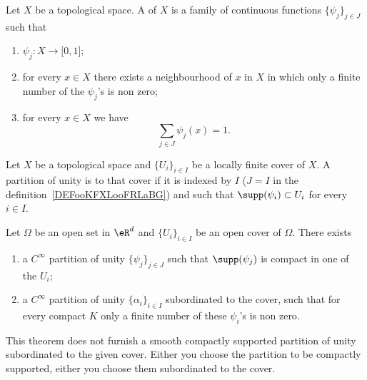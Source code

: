 \begin{definition}       \label{DEFooKFXLooFRLaBG}
	Let \( X\) be a topological space. A  of \( X\) is a family of continuous functions \( \{ \psi_j \}_{j\in J}\) such that
	\begin{enumerate}
		\item
		      \( \psi_j\colon X\to \mathopen[ 0 , 1 \mathclose]\);
		\item
		      for every \( x\in X\) there exists a neighbourhood of \( x\) in \( X\) in which only a finite number of the \( \psi_j\)'s is non zero;
		\item
		      for every \( x\in X\) we have
		      \begin{equation}
			      \sum_{j\in J}\psi_j(x)=1.
		      \end{equation}
	\end{enumerate}
\end{definition}

\begin{definition}
	Let \( X\) be a topological space and \( \{ U_i \}_{i\in I}\) be a locally finite cover of \( X\). A partition of unity is  to that cover if it is indexed by \( I\) (\( J=I\) in the definition~\ref{DEFooKFXLooFRLaBG}) and such that \( \supp(\psi_i)\subset U_i\) for every \( i\in I\).
\end{definition}

\begin{theorem}      \label{THOooPCHDooITWKpC}
	Let \( \Omega\) be an open set in \( \eR^d\) and \( \{ U_i \}_{i\in I}\) be an open cover of \( \Omega\). There exists
	\begin{enumerate}
		\item
		      a \(  C^{\infty}\) partition of unity \( \{ \psi_j \}_{j\in J}\) such that \( \supp(\psi_j)\) is compact in one of the \( U_i\);
		\item       \label{ITEMooFGMJooQPLqGY}
		      a \(  C^{\infty}\) partition of unity \( \{ \alpha_i \}_{i\in I}\) subordinated to the cover, such that for every compact \( K\) only a finite number of these \( \psi_i\)'s is non zero.
	\end{enumerate}
\end{theorem}

\begin{remark}
	This theorem does not furnish a smooth compactly supported partition of unity subordinated to the given cover. Either you choose the partition to be compactly supported, either you choose them subordinated to the cover.
\end{remark}

